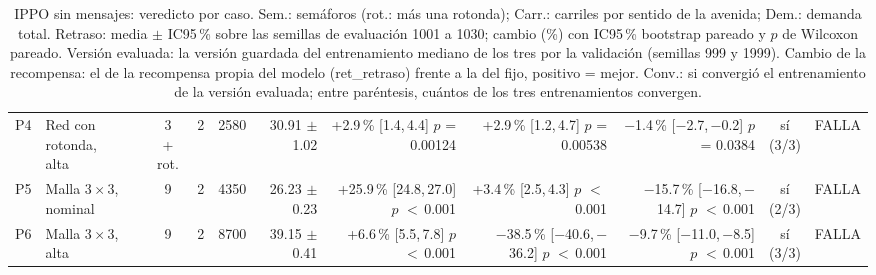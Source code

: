 \begin{table}[H]
\begin{tabular}{llcrrrrrrcl}
P4 & \makecell[l]{Red con\\{}rotonda,\\{}alta} & \makecell[c]{3\\{}+ rot.} & 2 & 2580 & \makecell[r]{30.91\\{}$\pm$ 1.02} & \makecell[r]{+2.9\,\%\\{}[1.4,\,4.4]\\$p$ = 0.00124} & \makecell[r]{+2.9\,\%\\{}[1.2,\,4.7]\\$p$ = 0.00538} & \makecell[r]{$-$1.4\,\%\\{}[$-$2.7,\,$-$0.2]\\$p$ = 0.0384} & \makecell[c]{sí\\{}(3/3)} & FALLA \\
P5 & \makecell[l]{Malla $3 \times 3$,\\{}nominal} & 9 & 2 & 4350 & \makecell[r]{26.23\\{}$\pm$ 0.23} & \makecell[r]{+25.9\,\%\\{}[24.8,\,27.0]\\$p$ $<$\,0.001} & \makecell[r]{+3.4\,\%\\{}[2.5,\,4.3]\\$p$ $<$\,0.001} & \makecell[r]{$-$15.7\,\%\\{}[$-$16.8,\,$-$14.7]\\$p$ $<$\,0.001} & \makecell[c]{sí\\{}(2/3)} & FALLA \\
P6 & \makecell[l]{Malla $3 \times 3$,\\{}alta} & 9 & 2 & 8700 & \makecell[r]{39.15\\{}$\pm$ 0.41} & \makecell[r]{+6.6\,\%\\{}[5.5,\,7.8]\\$p$ $<$\,0.001} & \makecell[r]{$-$38.5\,\%\\{}[$-$40.6,\,$-$36.2]\\$p$ $<$\,0.001} & \makecell[r]{$-$9.7\,\%\\{}[$-$11.0,\,$-$8.5]\\$p$ $<$\,0.001} & \makecell[c]{sí\\{}(3/3)} & FALLA \\
\bottomrule
\end{tabular}
\caption[Veredicto de IPPO sin mensajes]{IPPO sin mensajes: veredicto por caso. Sem.: semáforos (rot.: más una rotonda); Carr.: carriles por sentido de la avenida; Dem.: demanda total. Retraso: media $\pm$ IC95\,\% sobre las semillas de evaluación 1001 a 1030; cambio (\%) con IC95\,\% bootstrap pareado y $p$ de Wilcoxon pareado. Versión evaluada: la versión guardada del entrenamiento mediano de los tres por la validación (semillas 999 y 1999). Cambio de la recompensa: el de la recompensa propia del modelo (ret\_retraso) frente a la del fijo, positivo = mejor. Conv.: si convergió el entrenamiento de la versión evaluada; entre paréntesis, cuántos de los tres entrenamientos convergen.}
\label{tab:veredicto-ippo-local}
\end{table}

